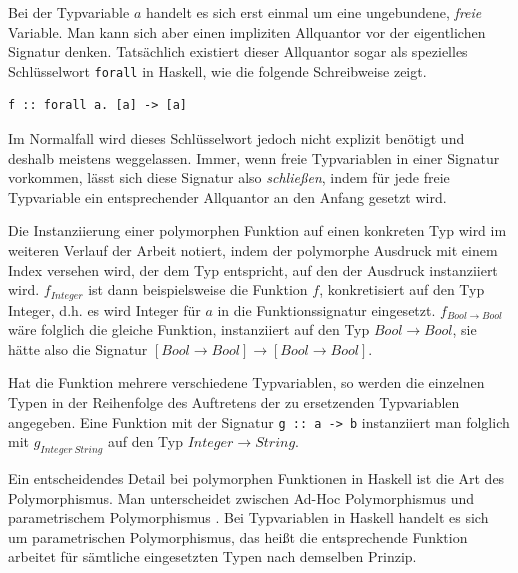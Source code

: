 Bei der Typvariable $a$ handelt es sich erst einmal um eine ungebundene, \textit{freie} Variable. Man kann sich aber einen impliziten
Allquantor vor der eigentlichen Signatur denken. Tatsächlich existiert dieser Allquantor sogar als spezielles Schlüsselwort \texttt{forall} in Haskell,
wie die folgende Schreibweise zeigt.

\begin{verbatim}
f :: forall a. [a] -> [a]
\end{verbatim}

Im Normalfall wird dieses Schlüsselwort jedoch nicht explizit benötigt und deshalb meistens weggelassen. Immer, wenn
freie Typvariablen in einer Signatur vorkommen, lässt sich diese Signatur also \textit{schließen}, indem für jede freie Typvariable
ein entsprechender Allquantor an den Anfang gesetzt wird.

Die Instanziierung einer polymorphen Funktion auf einen konkreten Typ wird im weiteren Verlauf der Arbeit notiert, indem der
polymorphe Ausdruck mit einem Index versehen wird, der dem Typ entspricht, auf den der Ausdruck instanziiert wird.
$f_{Integer}$ ist dann beispielsweise die Funktion $f$, konkretisiert auf den Typ Integer, d.h. es wird Integer
für $a$ in die Funktionssignatur eingesetzt. $f_{Bool \rightarrow Bool}$ wäre folglich die gleiche Funktion, instanziiert auf den Typ
$Bool \rightarrow Bool$, sie hätte also die Signatur $[Bool \rightarrow Bool] \rightarrow [Bool \rightarrow Bool]$.

Hat die Funktion mehrere verschiedene Typvariablen, so werden die einzelnen Typen
in der Reihenfolge des Auftretens der zu ersetzenden Typvariablen angegeben. Eine Funktion mit der Signatur \texttt{g :: a -> b} instanziiert man
folglich mit $g_{Integer\ String}$ auf den Typ $Integer \rightarrow String$.


Ein entscheidendes Detail bei polymorphen Funktionen in Haskell ist die Art des Polymorphismus.
Man unterscheidet zwischen Ad-Hoc Polymorphismus und parametrischem Poly\-mor\-phis\-mus . Bei Typvariablen
in Haskell handelt es sich um parametrischen Polymorphismus, das heißt die entsprechende Funktion arbeitet für sämtliche
eingesetzten Typen nach demselben Prinzip.

